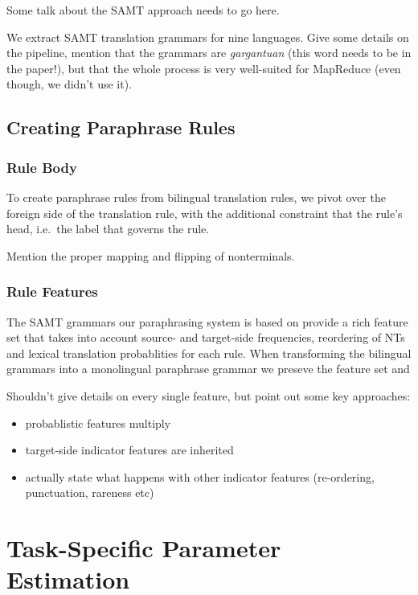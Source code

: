 \documentclass[11pt]{article}
\begin{document}
Some talk about the SAMT approach needs to go here. 

We extract SAMT translation grammars for nine languages. Give some
details on the pipeline, mention that the grammars are
\emph{gargantuan} (this word needs to be in the paper!), but that the
whole process is very well-suited for MapReduce (even though, we
didn't use it).

\subsection{Creating Paraphrase Rules} \label{rule_creation}

\subsubsection{Rule Body} \label{rule_body}

To create paraphrase rules from bilingual translation rules, we pivot
over the foreign side of the translation rule, with the additional
constraint that the rule's head, i.e.\ the label that governs the
rule.

Mention the proper mapping and flipping of nonterminals.

\subsubsection{Rule Features} \label{rule_features}

The SAMT grammars our paraphrasing system is based on provide a rich
feature set that takes into account source- and target-side
frequencies, reordering of NTs and lexical translation probablities
for each rule. When transforming the bilingual grammars into a
monolingual paraphrase grammar we preseve the feature set and

Shouldn't give details on every single feature, but point out some key
approaches:
\begin{itemize}
\item probablistic features multiply 
\item target-side indicator features are inherited
\item actually state what happens with other indicator features
  (re-ordering, punctuation, rareness etc)
\end{itemize}


\section{Task-Specific Parameter Estimation} 
\label{adaptation}
\end{document}
